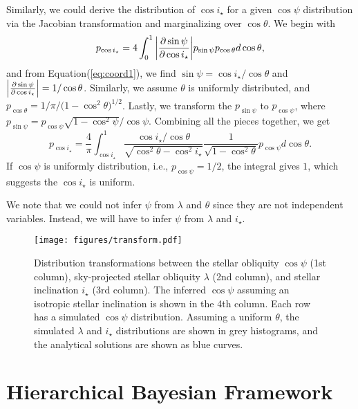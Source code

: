 \documentclass[twocolumn,times]{aastex631}
\begin{document}
Similarly, we could derive the distribution of $\cos{i_\star}$ for a given $\cos{\psi}$ distribution via the Jacobian transformation and marginalizing over $\cos{\theta}$. We begin with
\begin{equation}
    p_{\cos{i_\star}} = 4 \int_{0}^{1} \abs{\pdv{\sin{\psi}}{\cos{i_\star}}} p_{\sin{\psi}} p_{\cos{\theta}} d\cos{\theta},
\end{equation}
and from Equation(\ref{eq:coord1}), we find $\sin{\psi} = \cos{i_\star}/\cos{\theta}$ and $\abs{\pdv{\sin{\psi}}{\cos{i_\star}}} = 1/\cos{\theta}$. Similarly, we assume $\theta$ is uniformly distributed, and $p_{\cos{\theta}} = 1/\pi/(1-\cos^2{\theta)^{1/2}}$. Lastly, we transform the $p_{\sin{\psi}}$ to $p_{\cos{\psi}}$, where $p_{\sin{\psi}} = p_{\cos{\psi}}\sqrt{1-\cos^2{\psi}}/\cos{\psi}$. Combining all the pieces together, we get
\begin{equation}
    p_{\cos{i_\star}} = \frac{4}{\pi} \int_{\cos{i_\star}}^{1} \frac{\cos{i_\star}/\cos{\theta}}{\sqrt{\cos^2{\theta}-\cos^2{i_\star}}} \frac{1}{\sqrt{1-\cos^2{\theta}}} p_{\cos{\psi}} d\cos{\theta}.
\end{equation}
If $\cos{\psi}$ is uniformly distribution, i.e., $p_{\cos{\psi}} = 1/2$, the integral gives $1$, which suggests the $\cos{i_\star}$ is uniform.

We note that we could not infer $\psi$ from $\lambda$ and $\theta$ since they are not independent variables. Instead, we will have to infer $\psi$ from $\lambda$ and $i_\star$.

\begin{figure*}[ht!]
    \texttt{[image: figures/transform.pdf]}
    \caption{Distribution transformations between the stellar obliquity $\cos{\psi}$ (1st column), sky-projected stellar obliquity $\lambda$ (2nd column), and stellar inclination $i_\star$ (3rd column). The inferred $\cos{\psi}$ assuming an isotropic stellar inclination is shown in the 4th column. Each row has a simulated $\cos{\psi}$ distribution. Assuming a uniform $\theta$, the simulated $\lambda$ and $i_\star$ distributions are shown in grey histograms, and the analytical solutions are shown as blue curves.}
    \label{fig:transform}
\end{figure*}

\section{Hierarchical Bayesian Framework}\label{sec:hbm}
\end{document}
